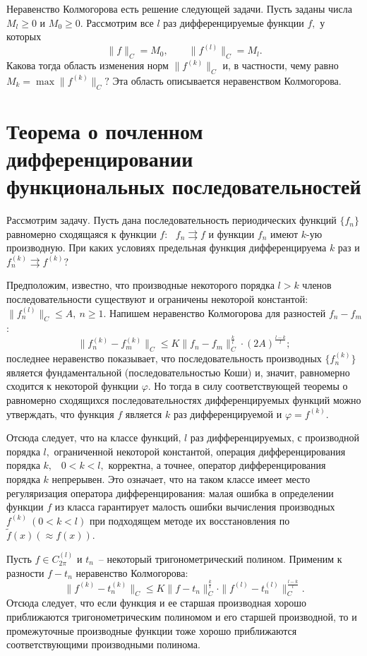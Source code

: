  Неравенство Колмогорова есть решение следующей
  задачи. Пусть  заданы числа $M_l\ge 0$ и $M_0\ge 0.$
 Рассмотрим все $l$ раз дифференцируемые функции $f,$
  у которых
 $$
 \|f\|_C=M_0,\qquad \|f^{(l)}\|_C=M_l.
 $$
 Какова тогда область изменения норм $\|f^{(k)}\|_C$
 и, в частности,  чему равно $M_k=\max\|f^{(k)}\|_C?$
 Эта область описывается неравенством Колмогорова.

 \section{Теорема о почленном дифференцировании\\ функциональных
 последовательностей}

 Рассмотрим задачу. Пусть дана последовательность периодических
 функций $\{f_n\}$ равномерно сходящаяся к функции $f$:~ $f_n\rightrightarrows
 f$ и функции $f_n$ имеют $k$-ую производную.
 При каких условиях предельная функция дифференцируема $k$
 раз и $f_n^{(k)} \rightrightarrows f^{(k)}?$

Предположим, известно, что производные некоторого порядка  $l>k$ членов
последовательности существуют и ограничены некоторой константой:
 $\|f_n^{(l)}\|_C\le {A},\ n\ge 1.$
 Напишем неравенство Колмогорова для разностей $f_n-f_m$:
  $$
 \|f_n^{(k)}-f_m^{(k)}\|_C\le K \|f_n-f_m\|_C^{\frac{k}{l}}\cdot
 (2{A})^{\frac{l-k}{l}};
 $$
 последнее неравенство показывает, что последовательность производных $\{f_n^{(k)}\}$
 является фундаментальной (последовательностью Коши) и, значит,
 равномерно сходится к некоторой функции $\varphi.$
 Но тогда в силу соответствующей теоремы о равномерно сходящихся
 последовательностях дифференцируемых функций можно утверждать,
 что функция $f$ является $k$ раз дифференцируемой и $\varphi=f^{(k)}$.

 Отсюда следует, что на классе  функций, $l$
 раз дифференцируемых, с производной порядка $l,$ ограниченной некоторой константой,
 операция дифференцирования порядка  $k,$~ $0<k<l,$ корректна, а точнее, оператор
 дифференцирования порядка $k$ непрерывен. Это
 означает, что на таком классе имеет место регуляризация оператора
 дифференцирования: малая ошибка в определении функции $f$
 из класса гарантирует малость ошибки вычисления
 производных $f^{(k)}\ (0<k<l)$ при подходящем методе их
 восстановления по $\widetilde{f}(x) (\approx f(x)).$

 Пусть $f\in {C}^{(l)}_{{2\pi}}$ и $t_n$~--
 некоторый тригонометрический полином.
 Применим к разности $f-t_n$ неравенство Колмогорова:
 $$
 \|f^{(k)}-t_n^{(k)}\|_C\le K \|f-t_n\|_C^{\frac{k}{{l}}}\cdot
 \|f^{(l)}-t_n^{(l)}\|_C^{\frac{l-k}{l}}.
 $$
 Отсюда следует, что если функция и  ее старшая производная
 хорошо приближаются тригонометрическим полиномом и его
 {старшей} производной, то и промежуточные производные
 функции тоже хорошо приближаются
 {соответствующими} {производными полинома}.

